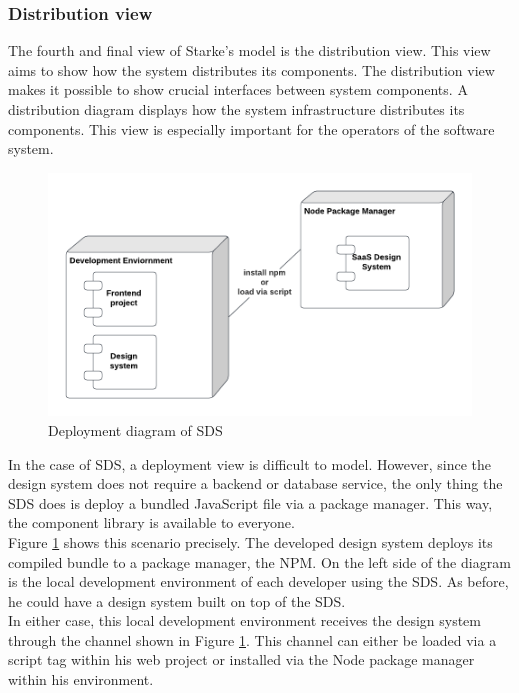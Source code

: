 \subsubsection{Distribution view}
The fourth and final view of Starke's model is the distribution view. This view aims to show how the system distributes its components. The distribution view makes it possible to show crucial interfaces between system components. A distribution diagram displays how the system infrastructure distributes its components. This view is especially important for the operators of the software system. \cite{starke_effektive_2020} \\
\begin{figure}[htbp]
    \centerline{
    \includegraphics[width=\linewidth]{images/deployment_diagram_sds.png}}
\caption{Deployment diagram of \ac{SDS}}
\label{deployment_diagram_sds}
\end{figure}
In the case of SDS, a deployment view is difficult to model. However, since the design system does not require a backend or database service, the only thing the SDS does is deploy a bundled JavaScript file via a package manager. This way, the component library is available to everyone. \\
Figure \ref{deployment_diagram_sds} shows this scenario precisely. The developed design system deploys its compiled bundle to a package manager, the \acl{NPM}. On the left side of the diagram is the local development environment of each developer using the \ac{SDS}. As before, he could have a design system built on top of the \ac{SDS}. \\
In either case, this local development environment receives the design system through the channel shown in Figure \ref{deployment_diagram_sds}. This channel can either be loaded via a script tag within his web project or installed via the Node package manager within his environment.  